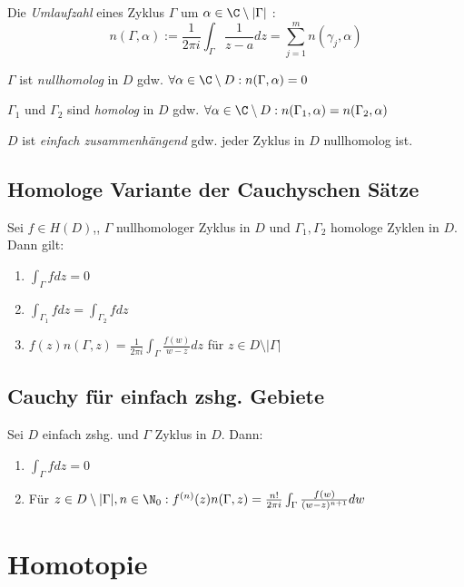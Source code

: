 Die \emph{Umlaufzahl} eines Zyklus \(\Gamma\) um \(\alpha \in \C \setminus |\Gamma|\) : \[n(\Gamma,\alpha) := \frac{1}{2\pi i} \int_\Gamma \frac{1}{z-a} dz = \sum_{j=1}^m n(\gamma_j,\alpha)\]

\(\Gamma\) ist \emph{nullhomolog} in \(D\) gdw. \(\forall \alpha \in \C \setminus D : n(\Gamma,\alpha) = 0\)

\(\Gamma_1\) und \(\Gamma_2\) sind \emph{homolog} in \(D\) gdw. \(\forall \alpha \in \C \setminus D : n(\Gamma_1,\alpha) = n(\Gamma_2,\alpha)\)

\(D\) ist \emph{einfach zusammenhängend} gdw. jeder Zyklus in \(D\) nullhomolog ist.

\subsection*{Homologe Variante der Cauchyschen Sätze}

Sei \(f \in H(D)\),, \(\Gamma\) nullhomologer Zyklus in \(D\) und \(\Gamma_1,\Gamma_2\) homologe Zyklen in \(D\). Dann gilt:

\begin{enumerate}[label=(\alph*)]
	\item \(\int_\Gamma f dz = 0\)
	\item \(\int_{\Gamma_1} f dz = \int_{\Gamma_2} f dz\)
	\item \(f(z) n(\Gamma,z) = \frac{1}{2\pi i} \int_\Gamma \frac{f(w)}{w-z} dz\) für \(z \in D \setminus |\Gamma|\)
\end{enumerate}

\subsection*{Cauchy für einfach zshg. Gebiete}

Sei \(D\) einfach zshg. und \(\Gamma\) Zyklus in \(D\). Dann:

\begin{enumerate}[label=(\alph*)]
	\item \(\int_\Gamma f dz = 0\)
	\item Für \(z \in D \setminus |\Gamma|, n \in \N_0 : \\ f^{(n)}(z) n(\Gamma,z) = \frac{n!}{2\pi i} \int_\Gamma \frac{f(w)}{(w-z)^{n+1}} dw\)
\end{enumerate}

\section*{Homotopie}

